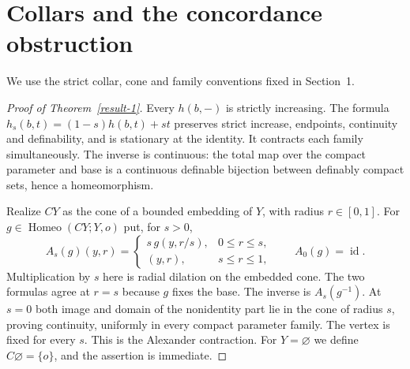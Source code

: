\documentclass[11pt,a4paper]{article}
\theoremstyle{definition}
\DeclareMathOperator{\Homeo}{Homeo}
\DeclareMathOperator{\id}{id}
\begin{document}
\section{Collars and the concordance obstruction}
We use the strict collar, cone and family conventions fixed in Section~1.
\begin{proof}[Proof of Theorem~\ref{result-1}]
Every $h(b,-)$ is strictly increasing. The formula
$h_s(b,t)=(1-s)h(b,t)+st$ preserves strict increase, endpoints,
continuity and definability, and is stationary at the identity. It
contracts each family simultaneously. The inverse is continuous:
the total map over the compact parameter and base is a continuous
definable bijection between definably compact sets, hence a homeomorphism.

Realize $CY$ as the cone of a bounded embedding of $Y$, with radius
$r\in[0,1]$. For $g\in\Homeo(CY;Y,o)$ put, for $s>0$,
\[
 A_s(g)(y,r)=
 \begin{cases}
 s\,g(y,r/s),&0\leq r\leq s,\\
 (y,r),&s\leq r\leq1,
 \end{cases}
 \qquad A_0(g)=\id.
\]
Multiplication by $s$ here is radial dilation on the embedded cone.
The two formulas agree at $r=s$ because $g$ fixes the base. The inverse
is $A_s(g^{-1})$. At $s=0$ both image and domain of the nonidentity
part lie in the cone of radius $s$, proving continuity, uniformly in
every compact parameter family. The vertex is fixed for every $s$.
This is the Alexander contraction. For $Y=\varnothing$ we define
$C\varnothing=\{o\}$, and the assertion is immediate.
\end{proof}
\end{document}
